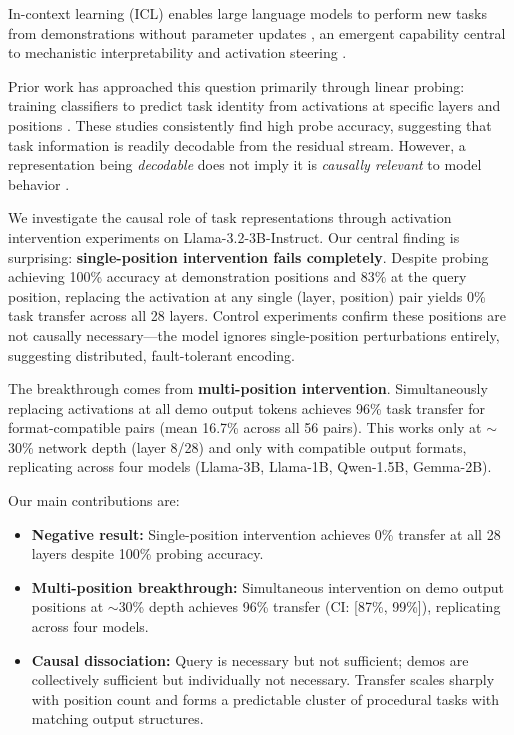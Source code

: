 \documentclass{article}
\begin{document}
In-context learning (ICL) enables large language models to perform new tasks from demonstrations without parameter updates \citep{brown2020language,garg2022can}, an emergent capability \citep{wei2022emergent} central to mechanistic interpretability and activation steering \citep{turner2023activation}.

Prior work has approached this question primarily through linear probing: training classifiers to predict task identity from activations at specific layers and positions \citep{todd2023function,hendel2023context}. These studies consistently find high probe accuracy, suggesting that task information is readily decodable from the residual stream. However, a representation being \emph{decodable} does not imply it is \emph{causally relevant} to model behavior \citep{ravfogel2020null,elazar2021amnesic}.

We investigate the causal role of task representations through activation intervention experiments on Llama-3.2-3B-Instruct. Our central finding is surprising: \textbf{single-position intervention fails completely}. Despite probing achieving 100\% accuracy at demonstration positions and 83\% at the query position, replacing the activation at any single (layer, position) pair yields 0\% task transfer across all 28 layers. Control experiments confirm these positions are not causally necessary---the model ignores single-position perturbations entirely, suggesting distributed, fault-tolerant encoding.

The breakthrough comes from \textbf{multi-position intervention}. Simultaneously replacing activations at all demo output tokens achieves 96\% task transfer for format-compatible pairs (mean 16.7\% across all 56 pairs). This works only at $\sim$30\% network depth (layer 8/28) and only with compatible output formats, replicating across four models (Llama-3B, Llama-1B, Qwen-1.5B, Gemma-2B).

Our main contributions are:
\begin{itemize}
    \item \textbf{Negative result:} Single-position intervention achieves 0\% transfer at all 28 layers despite 100\% probing accuracy.
    \item \textbf{Multi-position breakthrough:} Simultaneous intervention on demo output positions at $\sim$30\% depth achieves 96\% transfer (CI: [87\%, 99\%]), replicating across four models.
    \item \textbf{Causal dissociation:} Query is necessary but not sufficient; demos are collectively sufficient but individually not necessary. Transfer scales sharply with position count and forms a predictable cluster of procedural tasks with matching output structures.
\end{itemize}
\end{document}

